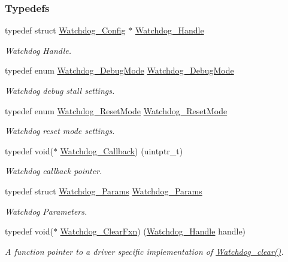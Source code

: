 \subsubsection*{Typedefs}
\begin{DoxyCompactItemize}
\item 
typedef struct \hyperlink{struct_watchdog___config}{Watchdog\+\_\+\+Config} $\ast$ \hyperlink{_watchdog_8h_a00ed22749c947ef200434eeec507f90d}{Watchdog\+\_\+\+Handle}
\begin{DoxyCompactList}\small\item\em Watchdog Handle. \end{DoxyCompactList}\item 
typedef enum \hyperlink{_watchdog_8h_ab1aa5862661c88a16b9d7bc12709d51e}{Watchdog\+\_\+\+Debug\+Mode} \hyperlink{_watchdog_8h_a369f0c40c3acb08f0ad21df99aedd42f}{Watchdog\+\_\+\+Debug\+Mode}
\begin{DoxyCompactList}\small\item\em Watchdog debug stall settings. \end{DoxyCompactList}\item 
typedef enum \hyperlink{_watchdog_8h_ada0db7216129d7dad494bb0cd0169f88}{Watchdog\+\_\+\+Reset\+Mode} \hyperlink{_watchdog_8h_a49befb9cfb12eb30c8832809bcbaa3a4}{Watchdog\+\_\+\+Reset\+Mode}
\begin{DoxyCompactList}\small\item\em Watchdog reset mode settings. \end{DoxyCompactList}\item 
typedef void($\ast$ \hyperlink{_watchdog_8h_abb9d5f385013e9950884200d8d05fd05}{Watchdog\+\_\+\+Callback}) (uintptr\+\_\+t)
\begin{DoxyCompactList}\small\item\em Watchdog callback pointer. \end{DoxyCompactList}\item 
typedef struct \hyperlink{struct_watchdog___params}{Watchdog\+\_\+\+Params} \hyperlink{_watchdog_8h_a001003d331ef831675e9a8388a81041c}{Watchdog\+\_\+\+Params}
\begin{DoxyCompactList}\small\item\em Watchdog Parameters. \end{DoxyCompactList}\item 
typedef void($\ast$ \hyperlink{_watchdog_8h_a0315c4931ba68423472f47c23c86f296}{Watchdog\+\_\+\+Clear\+Fxn}) (\hyperlink{_watchdog_8h_a00ed22749c947ef200434eeec507f90d}{Watchdog\+\_\+\+Handle} handle)
\begin{DoxyCompactList}\small\item\em A function pointer to a driver specific implementation of \hyperlink{_watchdog_8h_a396decd6b1807db10c636f9987c3be4c}{Watchdog\+\_\+clear()}. \end{DoxyCompactList}\item 

\end{DoxyCompactItemize}
